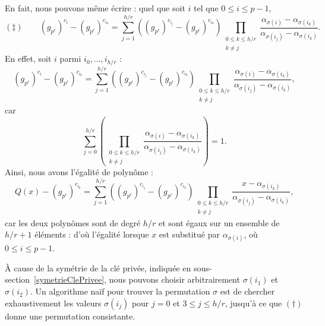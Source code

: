 \documentclass[a4paper, titlepage]{article}
\theoremstyle{definition}
\theoremstyle{remark}
\begin{document}
En fait, nous pouvons même écrire : quel que soit $i$ tel que $0\leqslant i \leqslant p-1$,
$$(\ddagger) \qquad (g_{p^r})^{c_i} - (g_{p^r})^{c_{i_0}} = \sum_{j=1}^{h/r} \left((g_{p^r})^{c_{i_j}} - (g_{p^r})^{c_{i_0}} \right)\prod_{\substack{0\leqslant k\leqslant h/r \\ k \neq j}} \frac{\alpha_{\sigma(i)}-\alpha_{\sigma(i_k)}}{\alpha_{\sigma(i_j)}-\alpha_{\sigma(i_k)}}.$$
En effet, soit $i$ parmi $i_0, \dots, i_{h/r}$ :
$$(g_{p^r})^{c_i} - (g_{p^r})^{c_{i_0}} = \sum_{j=1}^{h/r} \left((g_{p^r})^{c_{i_j}} - (g_{p^r})^{c_{i_0}} \right)\prod_{\substack{0\leqslant k\leqslant h/r \\ k \neq j}} \frac{\alpha_{\sigma(i)}-\alpha_{\sigma(i_k)}}{\alpha_{\sigma(i_j)}-\alpha_{\sigma(i_k)}},$$
car $$\sum_{j=0}^{h/r} \left(\prod_{\substack{0\leqslant k\leqslant h/r \\ k \neq j}} \frac{\alpha_{\sigma(i)}-\alpha_{\sigma(i_k)}}{\alpha_{\sigma(i_j)}-\alpha_{\sigma(i_k)}}\right) = 1.$$
Ainsi, nous avons l'égalité de polynôme :
$$Q(x) - (g_{p^r})^{c_{i_0}} = \sum_{j=1}^{h/r} \left((g_{p^r})^{c_{i_j}} - (g_{p^r})^{c_{i_0}} \right)\prod_{\substack{0\leqslant k\leqslant h/r \\ k \neq j}} \frac{x-\alpha_{\sigma(i_k)}}{\alpha_{\sigma(i_j)}-\alpha_{\sigma(i_k)}},$$
car les deux polynômes sont de degré $h/r$ et sont égaux sur un ensemble de $h/r + 1$ éléments : d'où l'égalité lorsque $x$ est substitué par $\alpha_{\sigma(i)}$, où $0\leqslant i \leqslant p-1$.

\`A cause de la symétrie de la clé privée, indiquée en sous-section~\ref{symetrieClePrivee}, nous pouvons choisir arbitrairement $\sigma(i_1)$ et $\sigma(i_2)$. Un algorithme naïf pour trouver la permutation $\sigma$ est de chercher exhaustivement les valeurs  $\sigma(i_j)$ pour $j=0$ et $3\leqslant j \leqslant h/r$, jusqu'à ce que $(\dagger)$ donne une permutation consistante.
\end{document}

